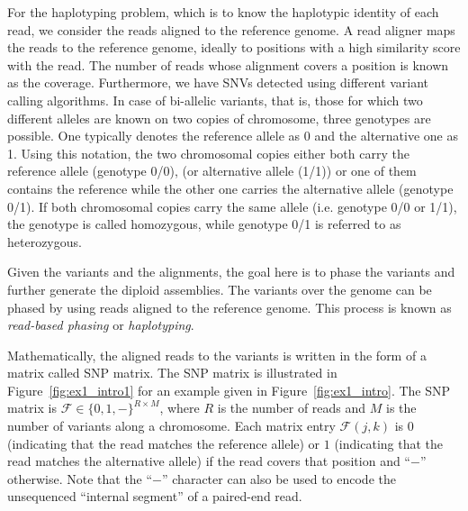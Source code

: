 For the haplotyping problem, which is to know the haplotypic identity of each read, we consider the reads aligned to the reference genome.
A read aligner maps the reads to the reference genome, ideally to positions with a high similarity score with the read. 
The number of reads whose alignment covers a position is known as the coverage.
Furthermore, we have SNVs detected using different variant calling algorithms.
In case of bi-allelic variants, that is, those for which two different alleles are known on two copies of chromosome, three genotypes are possible.
One typically denotes the reference allele as 0 and the alternative one as 1. Using this
notation, the two chromosomal copies either both carry the reference allele (genotype
0/0), (or alternative allele (1/1)) or one of them contains the reference while
the other one carries the alternative allele (genotype 0/1). If both chromosomal copies
carry the same allele (i.e. genotype 0/0 or 1/1), the genotype is called homozygous, while
genotype 0/1 is referred to as heterozygous.

Given the variants and the alignments, the goal here is to phase the variants and further generate the diploid assemblies. 
The variants over the genome can be phased by using reads aligned to the reference genome. This process is known as \textit{read-based phasing} or \textit{haplotyping}.

Mathematically, the aligned reads to the variants is written in the form of a matrix called SNP matrix.
The SNP matrix is illustrated in Figure~\ref{fig:ex1_intro1} for an example given in Figure~\ref{fig:ex1_intro}.
The SNP matrix is $\mathcal{F}\in\{0,1,-\}^{R\times M}$, where $R$ is the number of reads and $M$ is the number of variants along a chromosome.
Each matrix entry $\mathcal{F}(j,k)$ is $0$ (indicating that the read matches the reference allele) or $1$ (indicating that the read matches the alternative allele) if the read covers that position and ``$-$'' otherwise.
Note that the ``$-$'' character can also be used to encode the unsequenced ``internal segment'' of a paired-end read.

